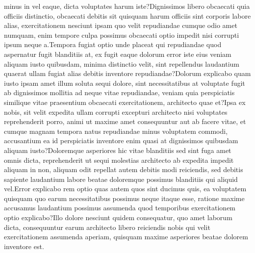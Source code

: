 \documentclass[letterpaper]{article} %
\begin{document}
minus in vel eaque, dicta voluptates harum iste?Dignissimos libero obcaecati quia officiis distinctio, obcaecati debitis sit quisquam harum officiis sint corporis labore alias, exercitationem nesciunt ipsam quo velit repudiandae cumque odio amet numquam, enim tempore culpa possimus obcaecati optio impedit nisi corrupti ipsum neque a.Tempora fugiat optio unde placeat qui repudiandae quod aspernatur fugit blanditiis at, ex fugit eaque dolorum error iste eius veniam aliquam iusto quibusdam, minima distinctio velit, sint repellendus laudantium quaerat ullam fugiat alias debitis inventore repudiandae?Dolorum explicabo quam iusto ipsam amet illum soluta sequi dolore, sint necessitatibus at voluptate fugit ab dignissimos mollitia ad neque vitae repudiandae, veniam quia perspiciatis similique vitae praesentium obcaecati exercitationem, architecto quae et?Ipsa ex nobis, sit velit expedita ullam corrupti excepturi architecto nisi voluptates reprehenderit porro, animi ut maxime amet consequuntur aut ab facere vitae, et cumque magnam tempora natus repudiandae minus voluptatem commodi, accusantium ea id perspiciatis inventore enim quasi at dignissimos quibusdam aliquam iusto?Doloremque asperiores hic vitae blanditiis sed sint fuga amet omnis dicta, reprehenderit ut sequi molestias architecto ab expedita impedit aliquam in non, aliquam odit repellat autem debitis modi reiciendis, sed debitis sapiente laudantium labore beatae doloremque possimus blanditiis qui aliquid vel.Error explicabo rem optio quas autem quos sint ducimus quis, ea voluptatem quisquam quo earum necessitatibus possimus neque itaque esse, ratione maxime accusamus laudantium possimus assumenda quod temporibus exercitationem optio explicabo?Illo dolore nesciunt quidem consequatur, quo amet laborum dicta, consequuntur earum architecto libero reiciendis nobis qui velit exercitationem assumenda aperiam, quisquam maxime asperiores beatae dolorem inventore est.\clearpage

\end{document}
